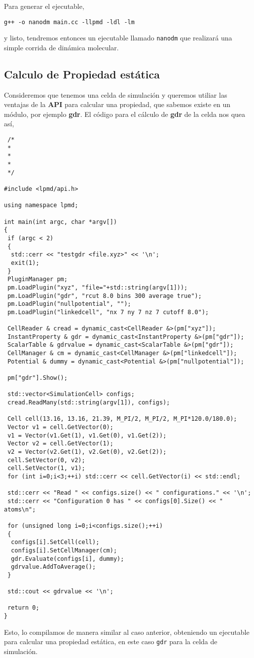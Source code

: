 \documentclass[a4paper,10pt]{scrbook}
\newcommand{\control}[1]{\begin{center}\begin{minipage}{10cm}\texttt{#1}\end{minipage}\end{center}}
\begin{document}
Para generar el ejecutable,

\control{g++ -o nanodm main.cc -llpmd -ldl -lm}

y listo, tendremos entonces un ejecutable llamado \verb|nanodm| que realizar\'a una simple corrida de din\'amica molecular.

\subsection{Calculo de Propiedad est\'atica}

Consideremos que tenemos una celda de simulaci\'on y queremos utiliar las ventajas de la \textbf{API} para calcular una propiedad, que sabemos existe en un m\'odulo, por ejemplo \textbf{gdr}. El c\'odigo para el c\'alculo de \textbf{gdr} de la celda nos quea as\'i,

\begin{verbatim}
 /*
 *
 *
 *
 */

#include <lpmd/api.h>

using namespace lpmd;

int main(int argc, char *argv[])
{
 if (argc < 2) 
 {
  std::cerr << "testgdr <file.xyz>" << '\n';
  exit(1);
 }
 PluginManager pm;
 pm.LoadPlugin("xyz", "file="+std::string(argv[1]));
 pm.LoadPlugin("gdr", "rcut 8.0 bins 300 average true");
 pm.LoadPlugin("nullpotential", "");
 pm.LoadPlugin("linkedcell", "nx 7 ny 7 nz 7 cutoff 8.0");

 CellReader & cread = dynamic_cast<CellReader &>(pm["xyz"]);
 InstantProperty & gdr = dynamic_cast<InstantProperty &>(pm["gdr"]); 
 ScalarTable & gdrvalue = dynamic_cast<ScalarTable &>(pm["gdr"]);
 CellManager & cm = dynamic_cast<CellManager &>(pm["linkedcell"]);
 Potential & dummy = dynamic_cast<Potential &>(pm["nullpotential"]);

 pm["gdr"].Show();

 std::vector<SimulationCell> configs;
 cread.ReadMany(std::string(argv[1]), configs);

 Cell cell(13.16, 13.16, 21.39, M_PI/2, M_PI/2, M_PI*120.0/180.0);
 Vector v1 = cell.GetVector(0);
 v1 = Vector(v1.Get(1), v1.Get(0), v1.Get(2));
 Vector v2 = cell.GetVector(1);
 v2 = Vector(v2.Get(1), v2.Get(0), v2.Get(2));
 cell.SetVector(0, v2);
 cell.SetVector(1, v1);
 for (int i=0;i<3;++i) std::cerr << cell.GetVector(i) << std::endl;

 std::cerr << "Read " << configs.size() << " configurations." << '\n';
 std::cerr << "Configuration 0 has " << configs[0].Size() << " atoms\n";

 for (unsigned long i=0;i<configs.size();++i)
 {
  configs[i].SetCell(cell);
  configs[i].SetCellManager(cm);
  gdr.Evaluate(configs[i], dummy);
  gdrvalue.AddToAverage();
 }

 std::cout << gdrvalue << '\n';

 return 0;
}
\end{verbatim}

Esto, lo compilamos de manera similar al caso anterior, obteniendo un ejecutable para calcular una propiedad est\'atica, en este caso \verb|gdr| para la celda de simulaci\'on.
\end{document}
